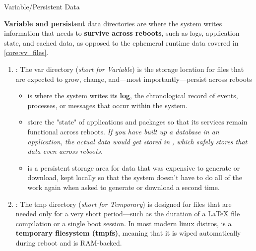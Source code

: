 \documentclass[10pt]{article}
\begin{document}
    \begin{core}{Variable/Persistent Data}

      \textbf{Variable and persistent} data directories are where the system writes information that needs to \textbf{survive across reboots}, such as logs, application state, and cached data, as opposed to the ephemeral runtime data covered in \autoref{core:vv_files}.

      \begin{enumerate}

        \item {} : The var directory (\textit{short for Variable}) is the storage location for files that are expected to grow, change, and---most importantly---persist across reboots

        \begin{itemize}

          \item {} is where the system writes its \textbf{log}, the chronological record of events, processes, or messages that occur within the system.

          \item {} store the "state" of applications and packages so that its services remain functional across reboots. \textit{If you have built up a database in an application, the actual data would get stored in , which safely stores that data even across reboots.}

          \item {} is a persistent storage area for data that was expensive to generate or download, kept locally so that the system doesn't have to do all of the work again when asked to generate or download a second time. 

        \end{itemize}

        \item {} : The tmp directory (\textit{short for Temporary}) is designed for files that are needed only for a very short period---such as the duration of a \LaTeX{} file compilation or a single boot session. In most modern linux distros,  is a \textbf{temporary filesystem (tmpfs)}, meaning that it is wiped automatically during reboot and is RAM-backed.

      \end{enumerate}

    \end{core}
\end{document}
